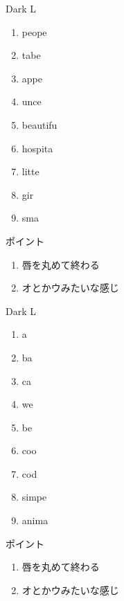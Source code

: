 \documentclass[aspectratio=169,xcolor={dvipsnames,table}]{beamer}
\begin{document}
\begin{frame}[plain]{Dark L}

\large

\begin{enumerate}
 \item peope
 \item tabe
 \item appe
 \item unce
 \item beautifu
 \item hospita
 \item litte
 \item gir
 \item sma
\end{enumerate}

\vspace*{10pt}

\small
ポイント

\begin{enumerate}
 \item 唇を丸めて終わる
 \item オとかウみたいな感じ
\hfill{\scriptsize {}}

\end{enumerate}
\end{frame}
\begin{frame}[plain]{Dark L}

\large

\begin{enumerate}
 \item a
 \item ba
 \item ca
 \item we
 \item be
 \item coo
 \item cod
 \item simpe
 \item anima
\end{enumerate}

\vspace*{10pt}

\small
ポイント

\begin{enumerate}
 \item 唇を丸めて終わる
 \item オとかウみたいな感じ
\hfill{\scriptsize {}}

\end{enumerate}
\end{frame}
\end{document}
